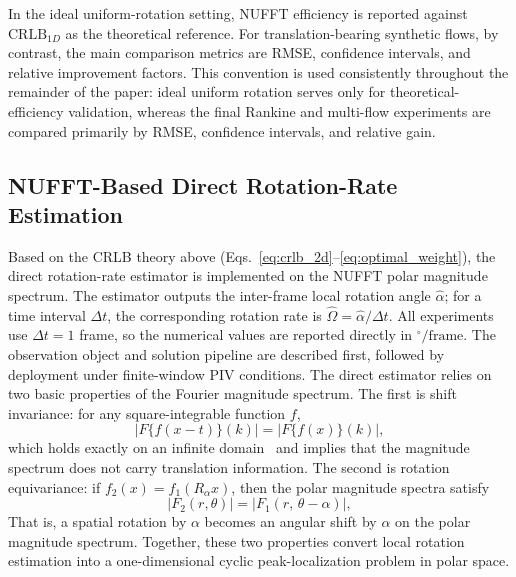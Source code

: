 \documentclass[lettersize,journal]{IEEEtran}
\newcommand{\CRLB}{\mathrm{CRLB}}
\begin{document}
In the ideal uniform-rotation setting, NUFFT efficiency is reported against $\CRLB_{1D}$ as the theoretical reference.
For translation-bearing synthetic flows, by contrast, the main comparison metrics are RMSE, confidence intervals, and relative improvement factors.
This convention is used consistently throughout the remainder of the paper:
ideal uniform rotation serves only for theoretical-efficiency validation,
whereas the final Rankine and multi-flow experiments are compared primarily by RMSE, confidence intervals, and relative gain.

\subsection{NUFFT-Based Direct Rotation-Rate Estimation}
\label{sec:method}

Based on the CRLB theory above (Eqs.~\eqref{eq:crlb_2d}--\eqref{eq:optimal_weight}), the direct rotation-rate estimator is implemented on the NUFFT polar magnitude spectrum.
The estimator outputs the inter-frame local rotation angle $\hat{\alpha}$;
for a time interval $\Delta t$, the corresponding rotation rate is
$\hat{\Omega}=\hat{\alpha}/\Delta t$.
All experiments use $\Delta t=1$ frame,
so the numerical values are reported directly in $^\circ/\mathrm{frame}$.
The observation object and solution pipeline are described first, followed by deployment under finite-window PIV conditions.
The direct estimator relies on two basic properties of the Fourier magnitude spectrum.
The first is shift invariance:
for any square-integrable function $f$,
\begin{equation}
  \bigl|F\bigl\{f(x-t)\bigr\}(k)\bigr|
  = \bigl|F\{f(x)\}(k)\bigr|,
  \label{eq:shift_invariance}
\end{equation}
which holds exactly on an infinite domain~\cite{Tong2019,Guizar2008}
and implies that the magnitude spectrum does not carry translation information.
The second is rotation equivariance:
if $f_2(x)=f_1(R_\alpha x)$,
then the polar magnitude spectra satisfy~\cite{Tong2019,Guizar2008}
\begin{equation}
  |F_2(r,\theta)| = |F_1(r,\,\theta - \alpha)|,
  \label{eq:rotation_equivariance}
\end{equation}
That is, a spatial rotation by $\alpha$ becomes an angular shift by $\alpha$ on the polar magnitude spectrum.
Together, these two properties convert local rotation estimation into a one-dimensional cyclic peak-localization problem in polar space.
\end{document}
